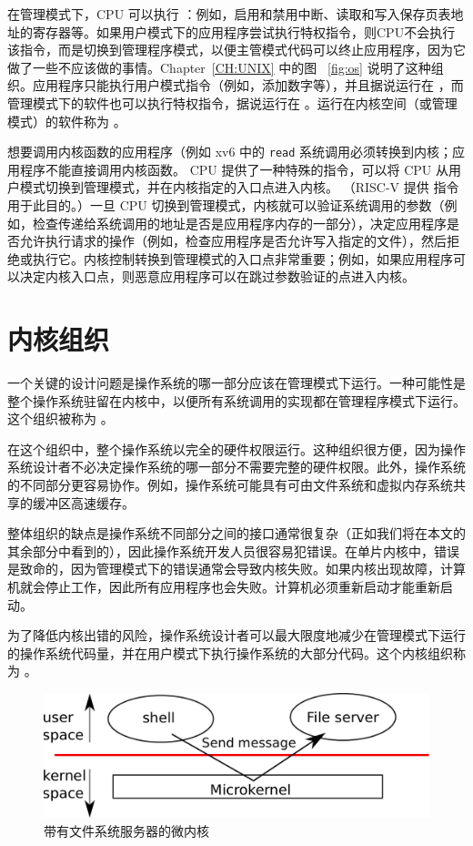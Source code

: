 在管理模式下，CPU 可以执行
        ：例如，启用和禁用中断、读取和写入保存页表地址的寄存器等。如果用户模式下的应用程序尝试执行特权指令，则CPU不会执行该指令，而是切换到管理程序模式，以便主管模式代码可以终止应用程序，因为它做了一些不应该做的事情。Chapter~\ref{CH:UNIX}   中的图 ~\ref{fig:os}   说明了这种组织。应用程序只能执行用户模式指令（例如，添加数字等），并且据说运行在
       ，而管理模式下的软件也可以执行特权指令，据说运行在
        。运行在内核空间（或管理模式）的软件称为
        。  

想要调用内核函数的应用程序（例如
 xv6 中的    \lstinline{read}    系统调用必须转换到内核；应用程序不能直接调用内核函数。 CPU 提供了一种特殊的指令，可以将 CPU 从用户模式切换到管理模式，并在内核指定的入口点进入内核。 （RISC-V 提供
        指令用于此目的。）一旦 CPU 切换到管理模式，内核就可以验证系统调用的参数（例如，检查传递给系统调用的地址是否是应用程序内存的一部分），决定应用程序是否允许执行请求的操作（例如，检查应用程序是否允许写入指定的文件），然后拒绝或执行它。内核控制转换到管理模式的入口点非常重要；例如，如果应用程序可以决定内核入口点，则恶意应用程序可以在跳过参数验证的点进入内核。
    \section{内核组织  }     

一个关键的设计问题是操作系统的哪一部分应该在管理模式下运行。一种可能性是整个操作系统驻留在内核中，以便所有系统调用的实现都在管理程序模式下运行。这个组织被称为
        。  

在这个组织中，整个操作系统以完全的硬件权限运行。这种组织很方便，因为操作系统设计者不必决定操作系统的哪一部分不需要完整的硬件权限。此外，操作系统的不同部分更容易协作。例如，操作系统可能具有可由文件系统和虚拟内存系统共享的缓冲区高速缓存。  

整体组织的缺点是操作系统不同部分之间的接口通常很复杂（正如我们将在本文的其余部分中看到的），因此操作系统开发人员很容易犯错误。在单片内核中，错误是致命的，因为管理模式下的错误通常会导致内核失败。如果内核出现故障，计算机就会停止工作，因此所有应用程序也会失败。计算机必须重新启动才能重新启动。  

为了降低内核出错的风险，操作系统设计者可以最大限度地减少在管理模式下运行的操作系统代码量，并在用户模式下执行操作系统的大部分代码。这个内核组织称为
        。  

\begin{figure}[t]
\center
\includegraphics[scale=0.5]{fig/mkernel.pdf}
\caption{带有文件系统服务器的微内核  }
\label{fig:mkernel}
\end{figure}     

